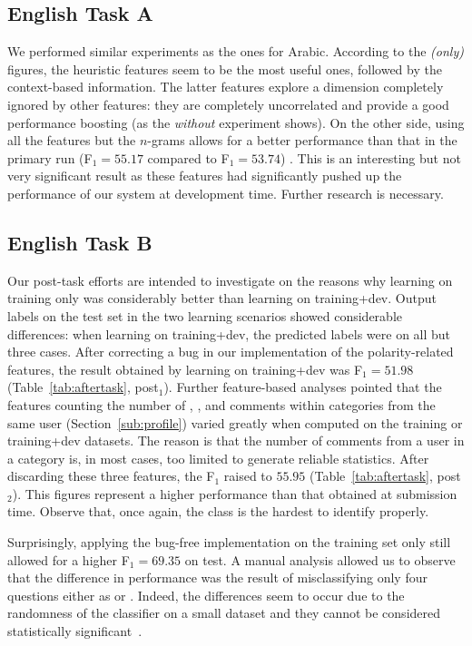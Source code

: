 \subsection{English Task A} \label{sec:discussiona}

We performed similar experiments as the ones for Arabic. According to the 
\textit{(only)} figures, the heuristic features seem to be the most useful ones, 
followed by the context-based information. The latter features explore a 
dimension completely ignored by other features:  they are completely 
uncorrelated and provide a good performance boosting (as the \textit{without} 
experiment shows). On the other side, using all the features but the $n$-grams 
allows for a better performance than that in the primary run (F$_1=55.17$ 
compared to F$_1=53.74$) . This is an interesting but not very significant 
result as these features had significantly pushed up the performance of our 
system at development time. Further research is necessary.
  
\subsection{English Task B} \label{sec:discussionb}

Our post-task efforts are intended to investigate on the reasons why learning on 
training only was considerably better than learning on training+dev. Output 
labels on the test set in the two learning scenarios showed considerable 
differences: when learning on training+dev, the predicted labels were \yes on 
all but three cases. After correcting a bug in our implementation of the 
polarity-related features, the result obtained by learning on training+dev was 
F$_1=51.98$ (Table~\ref{tab:aftertask}, post$_1$). Further feature-based 
analyses pointed that the features counting the number of \good, \bad, and \pot 
comments within categories from the same user (\cf Section~\ref{sub:profile}) 
varied greatly when computed on the training or training+dev datasets. The 
reason is that the number of comments from a user in a category is, in most 
cases, too limited to generate reliable statistics. After discarding these three 
features, the F$_1$ raised to $55.95$ (Table~\ref{tab:aftertask}, post$_2$). 
This figures represent a higher performance than that obtained at submission 
time. Observe that, once again, the \unsure class is the hardest to identify 
properly.

Surprisingly, applying the bug-free implementation on the training set only 
still allowed for a higher F$_1 =69.35$ on test. A manual analysis allowed us 
to observe that the difference in performance was the result of misclassifying 
only four questions either as \yes or \unsure. Indeed, the differences seem to 
occur due to the randomness of the classifier on a small dataset and they 
cannot be considered statistically 
significant~\cite{Marquez-EtAl:2015:SemEval}. 

